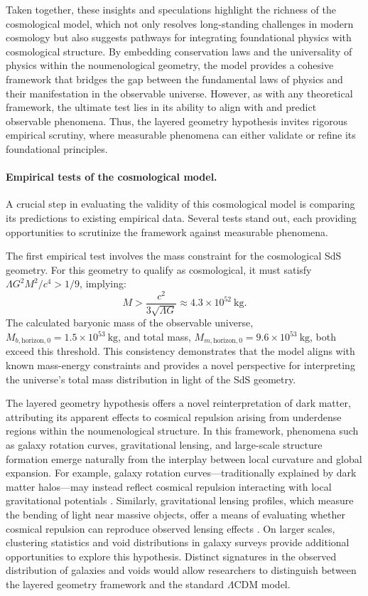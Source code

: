 \documentclass[aps,rmp,groupedaddress,twocolumn,10pt]{revtex4-2}
\begin{document}
Taken together, these insights and speculations highlight the richness of the cosmological model, which not only resolves long-standing challenges in modern cosmology but also suggests pathways for integrating foundational physics with cosmological structure. By embedding conservation laws and the universality of physics within the noumenological geometry, the model provides a cohesive framework that bridges the gap between the fundamental laws of physics and their manifestation in the observable universe. However, as with any theoretical framework, the ultimate test lies in its ability to align with and predict observable phenomena. Thus, the layered geometry hypothesis invites rigorous empirical scrutiny, where measurable phenomena can either validate or refine its foundational principles.

\paragraph{Empirical tests of the cosmological model.} A crucial step in evaluating the validity of this cosmological model is comparing its predictions to existing empirical data. Several tests stand out, each providing opportunities to scrutinize the framework against measurable phenomena.

The first empirical test involves the mass constraint for the cosmological SdS geometry. For this geometry to qualify as cosmological, it must satisfy $\Lambda G^2 M^2 / c^4 > 1/9$, implying:
\begin{equation}
M > \frac{c^2}{3\sqrt{\Lambda G}} \approx 4.3 \times 10^{52}~\text{kg}.
\end{equation}
The calculated baryonic mass of the observable universe, $M_{b,\text{horizon},0} = 1.5 \times 10^{53}~\text{kg}$, and total mass, $M_{m,\text{horizon},0} = 9.6 \times 10^{53}~\text{kg}$, both exceed this threshold. This consistency demonstrates that the model aligns with known mass-energy constraints and provides a novel perspective for interpreting the universe's total mass distribution in light of the SdS geometry.

The layered geometry hypothesis offers a novel reinterpretation of dark matter, attributing its apparent effects to cosmical repulsion arising from underdense regions within the noumenological structure. In this framework, phenomena such as galaxy rotation curves, gravitational lensing, and large-scale structure formation emerge naturally from the interplay between local curvature and global expansion. For example, galaxy rotation curves---traditionally explained by dark matter halos---may instead reflect cosmical repulsion interacting with local gravitational potentials \cite{Rubin1980}. Similarly, gravitational lensing profiles, which measure the bending of light near massive objects, offer a means of evaluating whether cosmical repulsion can reproduce observed lensing effects \cite{Refregier2003}. On larger scales, clustering statistics and void distributions in galaxy surveys provide additional opportunities to explore this hypothesis. Distinct signatures in the observed distribution of galaxies and voids would allow researchers to distinguish between the layered geometry framework and the standard $\Lambda$CDM model.
\end{document}
